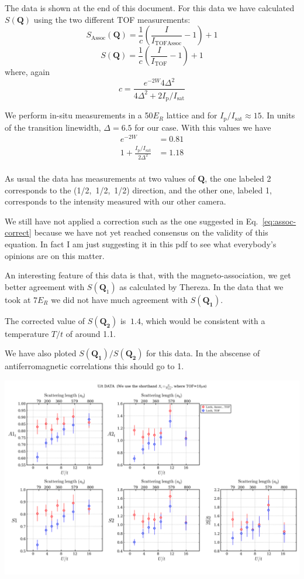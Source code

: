 \documentclass[11pt,letter]{article}
\newcommand{\bv}[1]{\ensuremath{\bm{#1}}}
\newcommand{\iisat}{\ensuremath{I_{\mathrm{p}}/I_{\mathrm{sat}}}}
\begin{document}
The data is shown  at the end of this document.  For this data we have
calculated $S(\bv{Q})$ using the two different TOF measurements: 
\begin{equation}
   S_{\mathrm{Assoc} }(\bv{Q}) =
 \frac{1}{c} \left( \frac{I}{I_{\text{TOFAssoc}} } - 1 \right)  + 1 
\end{equation}
\begin{equation}
   S(\bv{Q}) =
 \frac{1}{c} \left( \frac{I}{I_{\text{TOF}} } - 1 \right)  + 1 
\end{equation}
where, again
\begin{equation}
   c =   \frac{ e^{-2W}4 \Delta^{2}  } 
           {4 \Delta^{2} + 2 \iisat }  
\end{equation}

We perform in-situ measurements in a 50$E_{R}$ lattice and for $\iisat \approx
15$.  In units of the transition linewidth, $\Delta = 6.5$ for our case.   With
this values we have  
\begin{equation}
\begin{split}
  e^{-2W} & =  0.81\\
  1  +   \frac{\iisat}{2\Delta^{2} } & =  1.18\\  
\end{split}
\end{equation} 

As usual the data has measurements at two values of $\bv{Q}$, the one labeled 2
corresponds to the (1/2,~1/2,~1/2) direction,  and the other one, labeled 1,
corresponds to the intensity measured with our other camera. 

We still have not applied a correction such as the one suggested in
Eq.~\ref{eq:assoc-correct} because we have not yet reached consensus on
the validity of this equation.  In fact I am just suggesting it in this pdf to
see what everybody's  opinions are on this matter.  

An interesting feature of this data is that, with the magneto-association,  we
get better agreement with $S(\bv{Q}_{1})$ as calculated by Thereza. In the data
that we took at $7E_{R}$ we did not have much agreement with $S(\bv{Q_{1}})$.

The corrected value of $S(\bv{Q_{2}})$ is $~ 1.4$, which would be consistent with a temperature $T/t$ of around 1.1.

We have also ploted $S(\bv{Q_{1}})/S(\bv{Q_{2}})$ for this data.  In the abscense of antiferromagnetic correlations this should go to 1. 
  
\centering \includegraphics[width=\textwidth]{udata_5p5Er.png}






\end{document}
